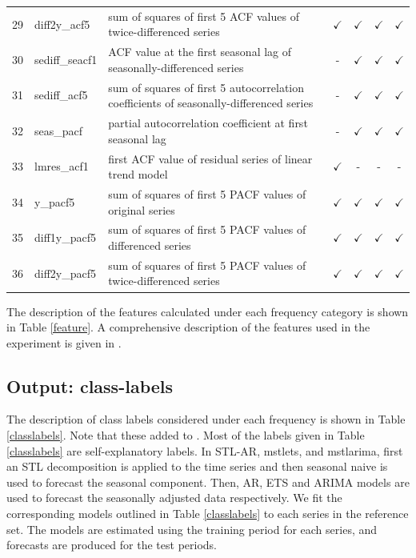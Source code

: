 \documentclass[11pt,a4paper,]{article}
\def\yes{$\checkmark$}
\begin{document}
\begin{table}[!htp]
\begin{tabular}{llp{}cccc}
29 & diff2y\_acf5   & sum of squares of first 5 ACF values of twice-differenced series                        & \yes  & \yes & \yes & \yes \\
30 & sediff\_seacf1 & ACF value at the first seasonal lag of seasonally-differenced series                    & -     & \yes & \yes & \yes\\
31 & sediff\_acf5   & sum of squares of first 5 autocorrelation coefficients of seasonally-differenced series & -     & \yes & \yes & \yes\\
32 & seas\_pacf     & partial autocorrelation coefficient at first seasonal lag & -     & \yes & \yes & \yes\\
33 & lmres\_acf1    & first ACF value of residual series of linear trend model                                & \yes  & - & - & -\\
34 & y\_pacf5       & sum of squares of first 5 PACF values of original series                                & \yes  & \yes & \yes & \yes\\
35 & diff1y\_pacf5  & sum of squares of first 5 PACF values of differenced series                             & \yes  & \yes & \yes & \yes\\
36 & diff2y\_pacf5  & sum of squares of first 5 PACF values of twice-differenced series                       & \yes  & \yes & \yes & \yes\\
\bottomrule
\end{tabular}
\end{table}

The description of the features calculated under each frequency category is shown in Table \ref{feature}. A comprehensive description of the features used in the experiment is given in \textcite{fforms}.

\hypertarget{output-class-labels}{%
\subsection{Output: class-labels}\label{output-class-labels}}

The description of class labels considered under each frequency is shown in Table \ref{classlabels}. Note that these added to \textcite{fforms}. Most of the labels given in Table \ref{classlabels} are self-explanatory labels. In STL-AR, mstlets, and mstlarima, first an STL decomposition is applied to the time series and then seasonal naive is used to forecast the seasonal component. Then, AR, ETS and ARIMA models are used to forecast the seasonally adjusted data respectively. We fit the corresponding models outlined in Table \ref{classlabels} to each series in the reference set. The models are estimated using the training period for each series, and forecasts are produced for the test periods.
\end{document}
